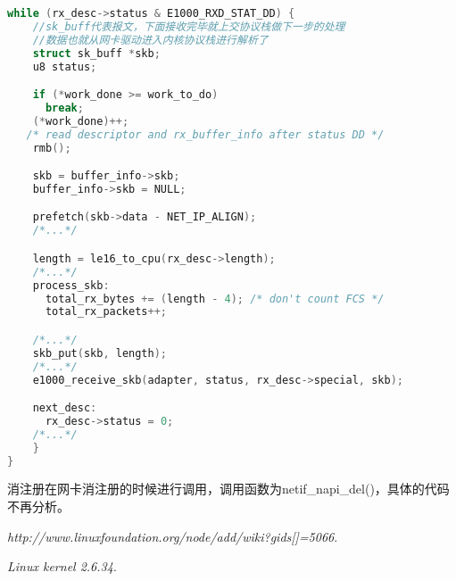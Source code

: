 \documentclass[fontsize=11pt, %
                             paper=a4, %
                             oneside, %
                             captions=tableheading,
                             index=totoc,
                             hyperref]{labbook}
\begin{document}
\begin{addmargin}[0cm]{0cm}
\begin{lstlisting}[language=C]
  while (rx_desc->status & E1000_RXD_STAT_DD) {
    //sk_buff代表报文，下面接收完毕就上交协议栈做下一步的处理
    //数据也就从网卡驱动进入内核协议栈进行解析了
    struct sk_buff *skb;
    u8 status;

    if (*work_done >= work_to_do)
      break;
    (*work_done)++;
   /* read descriptor and rx_buffer_info after status DD */
    rmb(); 

    skb = buffer_info->skb;
    buffer_info->skb = NULL;

    prefetch(skb->data - NET_IP_ALIGN);
    /*...*/

    length = le16_to_cpu(rx_desc->length);
    /*...*/
    process_skb:
      total_rx_bytes += (length - 4); /* don't count FCS */
      total_rx_packets++;

    /*...*/
    skb_put(skb, length);
    /*...*/
    e1000_receive_skb(adapter, status, rx_desc->special, skb);

    next_desc:
      rx_desc->status = 0;
    /*...*/
    }
}
\end{lstlisting}
\indent 消注册在网卡消注册的时候进行调用，调用函数为netif\_napi\_del()，具体的代码不再分析。






\end{addmargin}


\begin{thebibliography}{9}

\emph{http://www.linuxfoundation.org/node/add/wiki?gids[]=5066}.

\emph{Linux kernel 2.6.34}.

\end{thebibliography}

\end{document}
